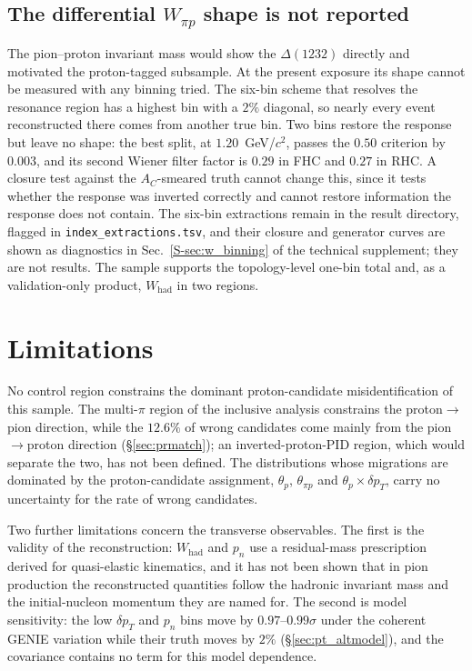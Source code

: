 \documentclass[11pt,a4paper]{article}
\newcommand{\suppref}[2]{#1~\ref{S-#2} of the technical supplement}
\begin{document}
\subsection{The differential \texorpdfstring{$W_{\pi p}$}{W pi p} shape is not reported}
\label{sec:pt_wpip_withdrawn}

The pion--proton invariant mass would show the $\Delta(1232)$ directly and motivated the
proton-tagged subsample. At the present exposure its shape cannot be measured with any binning
tried. The six-bin scheme that resolves the resonance region has a highest bin with a $2\%$
diagonal, so nearly every event reconstructed there comes from another true bin. Two bins restore
the response but leave no shape: the best split, at $1.20$~GeV/$c^2$, passes the $0.50$ criterion by
$0.003$, and its second Wiener filter factor is $0.29$ in FHC and $0.27$ in RHC. A closure test
against the $A_C$-smeared truth cannot change this, since it tests whether the response was inverted
correctly and cannot restore information the response does not contain. The six-bin extractions
remain in the result directory, flagged in \texttt{index\_extractions.tsv}, and their closure and
generator curves are shown as diagnostics in \suppref{Sec.}{sec:w_binning}; they are not results.
The sample supports the topology-level one-bin total and, as a validation-only product,
$W_\mathrm{had}$ in two regions.

\section{Limitations}
\label{sec:pt_limitations}

No control region constrains the dominant proton-candidate misidentification of this sample. The
multi-$\pi$ region of the inclusive analysis constrains the proton$\to$pion direction, while the
$12.6\%$ of wrong candidates come mainly from the pion$\to$proton direction (\S\ref{sec:prmatch}); an
inverted-proton-PID region, which would separate the two, has not been defined. The distributions whose
migrations are dominated by the proton-candidate assignment, $\theta_p$, $\theta_{\pi p}$ and
$\theta_p\times\delta p_T$, carry no uncertainty for the rate of wrong candidates.

Two further limitations concern the transverse observables. The first is the validity of the
reconstruction: $W_\mathrm{had}$ and $p_n$ use a residual-mass prescription derived for quasi-elastic
kinematics, and it has not been shown that in pion production the reconstructed quantities follow the
hadronic invariant mass and the initial-nucleon momentum they are named for. The second is model
sensitivity: the low $\delta p_T$ and $p_n$ bins move by $0.97$--$0.99\sigma$ under the coherent GENIE
variation while their truth moves by $2\%$ (\S\ref{sec:pt_altmodel}), and the covariance contains no
term for this model dependence.
\end{document}
